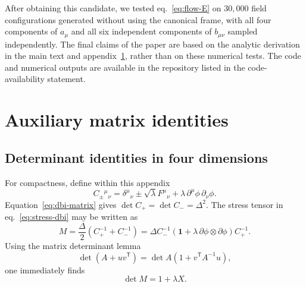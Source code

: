 \documentclass[a4paper,11pt]{article}
\numberwithin{equation}{section}
\newcommand{\Id}{\mathbf 1}
\begin{document}
After obtaining this candidate, we tested eq.~\eqref{eq:flow-E} on $30{,}000$ field configurations generated without using the canonical frame, with all four components of $a_\mu$ and all six independent components of $b_{\mu\nu}$ sampled independently. The final claims of the paper are based on the analytic derivation in the main text and appendix~\ref{app:matrix-identities}, rather than on these numerical tests. The code and numerical outputs are available in the repository listed in the code-availability statement.

\section{Auxiliary matrix identities}
\label{app:matrix-identities}

\subsection{Determinant identities in four dimensions}

For compactness, define within this appendix
\begin{equation}
 C_\pm{}^\mu{}_{\nu}
 =\delta^\mu{}_{\nu}\pm\sqrt\lambda F^\mu{}_{\nu}
 +\lambda\,\partial^\mu\phi\,\partial_\nu\phi.
 \label{eq:Cpm-app}
\end{equation}
Equation~\eqref{eq:dbi-matrix} gives $\det C_+=\det C_-=\Delta^2$. The stress tensor in eq.~\eqref{eq:stress-dbi} may be written as
\begin{equation}
 M=\frac\Delta2(C_+^{-1}+C_-^{-1})
 =\Delta C_-^{-1}\left(\Id+\lambda\,\partial\phi\otimes\partial\phi\right)C_+^{-1}.
 \label{eq:M-factor-app}
\end{equation}
Using the matrix determinant lemma
\begin{equation}
 \det(A+uv^{\mathsf T})=\det A\left(1+v^{\mathsf T}A^{-1}u\right),
 \label{eq:detlemma-app}
\end{equation}
one immediately finds
\begin{equation}
 \det M=1+\lambda X.
\end{equation}
\end{document}
